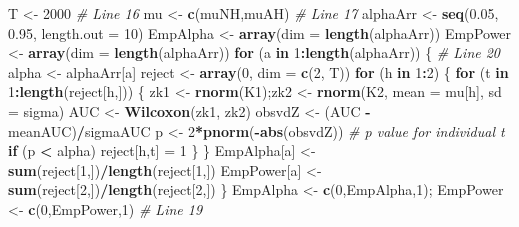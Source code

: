 \documentclass[
]{book}
\newenvironment{Shaded}{\begin{snugshade}}{\end{snugshade}}
\newcommand{\CommentTok}[1]{\textcolor[rgb]{0.56,0.35,0.01}{\textit{#1}}}
\newcommand{\ControlFlowTok}[1]{\textcolor[rgb]{0.13,0.29,0.53}{\textbf{#1}}}
\newcommand{\DataTypeTok}[1]{\textcolor[rgb]{0.13,0.29,0.53}{#1}}
\newcommand{\DecValTok}[1]{\textcolor[rgb]{0.00,0.00,0.81}{#1}}
\newcommand{\FloatTok}[1]{\textcolor[rgb]{0.00,0.00,0.81}{#1}}
\newcommand{\KeywordTok}[1]{\textcolor[rgb]{0.13,0.29,0.53}{\textbf{#1}}}
\newcommand{\NormalTok}[1]{#1}
\newcommand{\OperatorTok}[1]{\textcolor[rgb]{0.81,0.36,0.00}{\textbf{#1}}}
\newcommand{\StringTok}[1]{\textcolor[rgb]{0.31,0.60,0.02}{#1}}
\begin{document}
\begin{Shaded}
\begin{Highlighting}[]
\NormalTok{T \textless{}{-}}\StringTok{ }\DecValTok{2000}  \CommentTok{\# Line 16}
\NormalTok{mu \textless{}{-}}\StringTok{ }\KeywordTok{c}\NormalTok{(muNH,muAH) }\CommentTok{\# Line 17}
\NormalTok{alphaArr \textless{}{-}}\StringTok{ }\KeywordTok{seq}\NormalTok{(}\FloatTok{0.05}\NormalTok{, }\FloatTok{0.95}\NormalTok{, }\DataTypeTok{length.out =} \DecValTok{10}\NormalTok{)}
\NormalTok{EmpAlpha \textless{}{-}}\StringTok{ }\KeywordTok{array}\NormalTok{(}\DataTypeTok{dim =} \KeywordTok{length}\NormalTok{(alphaArr))}
\NormalTok{EmpPower \textless{}{-}}\StringTok{ }\KeywordTok{array}\NormalTok{(}\DataTypeTok{dim =} \KeywordTok{length}\NormalTok{(alphaArr))}
\ControlFlowTok{for}\NormalTok{ (a }\ControlFlowTok{in} \DecValTok{1}\OperatorTok{:}\KeywordTok{length}\NormalTok{(alphaArr)) \{ }\CommentTok{\# Line 20}
\NormalTok{  alpha \textless{}{-}}\StringTok{ }\NormalTok{alphaArr[a] }
\NormalTok{  reject \textless{}{-}}\StringTok{ }\KeywordTok{array}\NormalTok{(}\DecValTok{0}\NormalTok{, }\DataTypeTok{dim =} \KeywordTok{c}\NormalTok{(}\DecValTok{2}\NormalTok{, T))}
  \ControlFlowTok{for}\NormalTok{ (h }\ControlFlowTok{in} \DecValTok{1}\OperatorTok{:}\DecValTok{2}\NormalTok{) \{  }
    \ControlFlowTok{for}\NormalTok{ (t }\ControlFlowTok{in} \DecValTok{1}\OperatorTok{:}\KeywordTok{length}\NormalTok{(reject[h,])) \{  }
\NormalTok{      zk1 \textless{}{-}}\StringTok{ }\KeywordTok{rnorm}\NormalTok{(K1);zk2 \textless{}{-}}\StringTok{ }\KeywordTok{rnorm}\NormalTok{(K2, }\DataTypeTok{mean =}\NormalTok{ mu[h], }\DataTypeTok{sd =}\NormalTok{ sigma)  }
\NormalTok{      AUC \textless{}{-}}\StringTok{ }\KeywordTok{Wilcoxon}\NormalTok{(zk1, zk2)  }
\NormalTok{      obsvdZ \textless{}{-}}\StringTok{ }\NormalTok{(AUC }\OperatorTok{{-}}\StringTok{ }\NormalTok{meanAUC)}\OperatorTok{/}\NormalTok{sigmaAUC}
\NormalTok{      p \textless{}{-}}\StringTok{ }\DecValTok{2}\OperatorTok{*}\KeywordTok{pnorm}\NormalTok{(}\OperatorTok{{-}}\KeywordTok{abs}\NormalTok{(obsvdZ)) }\CommentTok{\# p value for individual t}
      \ControlFlowTok{if}\NormalTok{ (p }\OperatorTok{\textless{}}\StringTok{ }\NormalTok{alpha) reject[h,t] =}\StringTok{ }\DecValTok{1} 
\NormalTok{    \}}
\NormalTok{  \}}
\NormalTok{  EmpAlpha[a] \textless{}{-}}\StringTok{ }\KeywordTok{sum}\NormalTok{(reject[}\DecValTok{1}\NormalTok{,])}\OperatorTok{/}\KeywordTok{length}\NormalTok{(reject[}\DecValTok{1}\NormalTok{,])}
\NormalTok{  EmpPower[a] \textless{}{-}}\StringTok{ }\KeywordTok{sum}\NormalTok{(reject[}\DecValTok{2}\NormalTok{,])}\OperatorTok{/}\KeywordTok{length}\NormalTok{(reject[}\DecValTok{2}\NormalTok{,])}
\NormalTok{\}}
\NormalTok{EmpAlpha \textless{}{-}}\StringTok{ }\KeywordTok{c}\NormalTok{(}\DecValTok{0}\NormalTok{,EmpAlpha,}\DecValTok{1}\NormalTok{); EmpPower \textless{}{-}}\StringTok{ }\KeywordTok{c}\NormalTok{(}\DecValTok{0}\NormalTok{,EmpPower,}\DecValTok{1}\NormalTok{) }\CommentTok{\# Line 19}


\end{Highlighting}
\end{Shaded}
\end{document}
